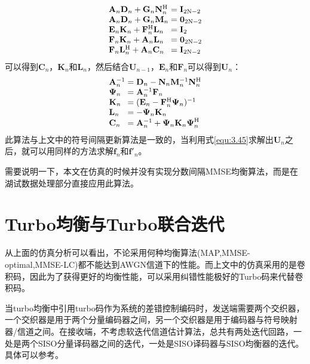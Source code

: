 \begin{eqnarray}
    \begin{array}{l@{\;=\;}l}
        \mathbf{A}_n\mathbf{D}_n+\mathbf{G}_n\mathbf{N}_n^{\mathrm{H}}&\mathbf{I}_{2\mathrm{N}-2}\\
        \mathbf{A}_n\mathbf{D}_n+\mathbf{G}_n\mathbf{M}_n&\mathbf{0}_{2\mathrm{N}-2}\\
        \mathbf{E}_n\mathbf{K}_n+\mathbf{F}_n^{\mathrm{H}}\mathbf{L}_n&\mathbf{I}_2\\
        \mathbf{F}_n\mathbf{K}_n+\mathbf{A}_n\mathbf{L}_n&\mathbf{0}_{2\mathrm{N}-2}\\
        \mathbf{F}_n\mathbf{L}_n^{\mathrm{H}}+\mathbf{A}_n\mathbf{C}_n&\mathbf{I}_{2\mathrm{N}-2}
    \end{array}
    \label{equ:3.44}
\end{eqnarray}
可以得到$\mathbf{C}_n\mbox{，}\mathbf{K}_n\mbox{和}\mathbf{L}_n$，然后结合$\mathbf{U}_{n-1}\mbox{，}\mathbf{E}_n\mbox{和}\mathbf{F}_n$可以得到$\mathbf{U}_n$：
\begin{eqnarray}
    \begin{array}{l@{\;=\;}l}
        \mathbf{A}_{n}^{-1}&\mathbf{D}_n-\mathbf{N}_n\mathbf{M}_n^{-1}\mathbf{N}_n^{\mathrm{H}}\\
        \boldsymbol{\Psi}_n&\mathbf{A}_n^{-1}\mathbf{F}_n\\
        \mathbf{K}_n&(\mathbf{E}_n-\mathbf{F}_n^{\mathrm{H}}\boldsymbol{\Psi}_n)^{-1}\\
        \mathbf{L}_n&-\boldsymbol{\Psi}_n\mathbf{K}_n\\
        \mathbf{C}_n&\mathbf{A}_n^{-1}+\boldsymbol{\Psi}_n\mathbf{K}_n\boldsymbol{\Psi}_n^{\mathrm{H}}
    \end{array}
    \label{equ:3.45}
\end{eqnarray}
此算法与上文中的符号间隔更新算法是一致的，当利用式\ref{equ:3.45}求解出$\mathbf{U}_n$之后，就可以用同样的方法求解$\mathbf{f}_n$和${\mathbf{f}}'_n$。

需要说明一下，本文在仿真的时候并没有实现分数间隔MMSE均衡算法，而是在湖试数据处理部分直接应用此算法。
\section{Turbo均衡与Turbo联合迭代}
从上面的仿真分析可以看出，不论采用何种均衡算法(MAP,MMSE-optimal,MMSE-LC)都不能达到AWGN信道下的性能。而上文中的仿真采用的是卷积码，因此为了获得更好的均衡性能，可以采用纠错性能极好的Turbo码来代替卷积码。

当turbo均衡中引用turbo码作为系统的差错控制编码时，发送端需要两个交织器，一个交织器是用于两个分量编码器之间，另一个交织器是用于编码器与符号映射器/信道之间。在接收端，不考虑软迭代信道估计算法，总共有两处迭代回路，一处是两个SISO分量译码器之间的迭代，一处是SISO译码器与SISO均衡器的迭代。具体可以参考。


